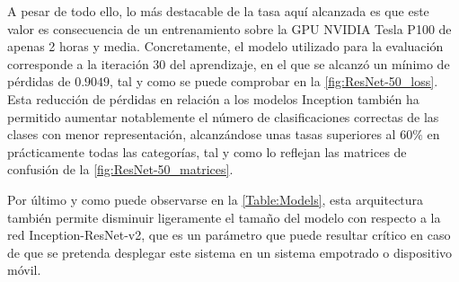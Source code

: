 A pesar de todo ello, lo más destacable de la tasa aquí alcanzada es que este valor es consecuencia de un entrenamiento sobre la GPU NVIDIA Tesla P100 de apenas 2 horas y media. Concretamente, el modelo utilizado para la evaluación corresponde a la iteración $30$ del aprendizaje, en el que se alcanzó un mínimo de pérdidas de $0.9049$, tal y como se puede comprobar en la \autoref{fig:ResNet-50_loss}. Esta reducción de pérdidas en relación a los modelos Inception también ha permitido aumentar notablemente el número de clasificaciones correctas de las clases con menor representación, alcanzándose unas tasas superiores al $60\%$ en prácticamente todas las categorías, tal y como lo reflejan las matrices de confusión de la \autoref{fig:ResNet-50_matrices}.

Por último y como puede observarse en la \autoref{Table:Models}, esta arquitectura también permite disminuir ligeramente el tamaño del modelo con respecto a la red Inception-ResNet-v2, que es un parámetro que puede resultar crítico en caso de que se pretenda desplegar este sistema en un sistema empotrado o dispositivo móvil.